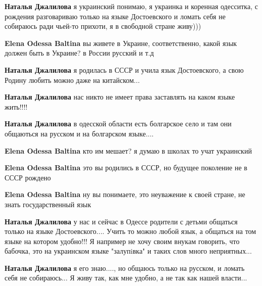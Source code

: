 \begin{itemize}
\begin{itemize}
\textbf{Наталья Джалилова} я украинский понимаю, я украинка и коренная
одесситка, с рождения разговариваю только на языке Достоевского и ломать себя
не собираюсь ради чьей-то прихоти, я в свободной стране живу)))


\textbf{Elena Odessa Baltina} вы живете в Украине, соответственно, какой язык
должен быть в Украине? в России русский и т.д

\textbf{Наталья Джалилова} я родилась в СССР и учила язык Достоевского, а свою Родину любить можно даже на китайском...

\textbf{Наталья Джалилова} нас никто не имеет права заставлять на каком языке жить!!!!

\textbf{Наталья Джалилова} в одесской области есть болгарское село и там они общаються на русском и на болгарском языке....

\textbf{Elena Odessa Baltina} кто им мешает? я думаю в школах то учат украинский

\textbf{Elena Odessa Baltina} это вы родились в СССР, но будущее поколение не в СССР рождено

\textbf{Elena Odessa Baltina} ну вы понимаете, это неуважение к своей стране, не знать государственный язык

\textbf{Наталья Джалилова} у нас и сейчас в Одессе родители с детьми общаться
только на языке Достоевского.... Учить то можно любой язык, а общаться на том
языке на котором удобно!!! Я например не хочу своим внукам говорить, что
бабочка, это на украинском языке "залупiвка" и таких слов много неприятных...

\textbf{Наталья Джалилова} я его знаю...., но общаюсь только на русском, и ломать себя не собираюсь... Я живу так, как мне удобно, а не так как нашей власти...


\end{itemize}
\end{itemize}
